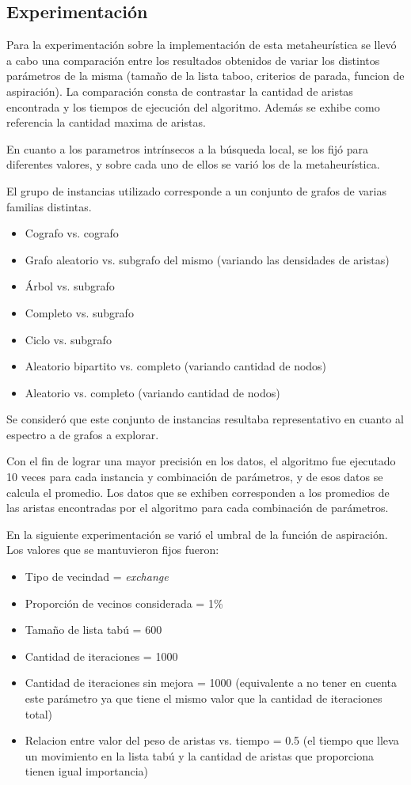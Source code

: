 \subsection{Experimentación}

Para la experimentación sobre la implementación de esta metaheurística se
llevó a cabo una comparación entre los resultados obtenidos de variar los
distintos parámetros de la misma (tamaño de la lista taboo, criterios de
parada, funcion de aspiración). La comparación consta de contrastar la
cantidad de aristas encontrada y los tiempos de ejecución del algoritmo.
Además se exhibe como referencia la cantidad maxima de aristas.

En cuanto a los parametros intrínsecos a la búsqueda local, se los
fijó para diferentes valores, y sobre cada uno de ellos se varió los de
la metaheurística.

El grupo de instancias utilizado corresponde a un conjunto de grafos de varias
familias distintas.

\begin{itemize}
\item Cografo vs. cografo
\item Grafo aleatorio vs. subgrafo del mismo (variando las densidades de
aristas)
\item Árbol vs. subgrafo
\item Completo vs. subgrafo
\item Ciclo vs. subgrafo
\item Aleatorio bipartito vs. completo (variando cantidad de nodos)
\item Aleatorio vs. completo (variando cantidad de nodos)
\end{itemize}

Se consideró que este conjunto de instancias resultaba representativo en
cuanto al espectro a de grafos a explorar.

Con el fin de lograr una mayor precisión en los datos, el algoritmo fue
ejecutado 10 veces para cada instancia y combinación de parámetros, y de esos
datos se calcula el promedio. Los datos que se exhiben corresponden a los
promedios de las aristas encontradas por el algoritmo para cada combinación de
parámetros.

En la siguiente experimentación se varió el umbral de la función de
aspiración. Los valores que se mantuvieron fijos fueron:

\begin{itemize}
\item Tipo de vecindad = \textit{exchange}
\item Proporción de vecinos considerada = 1\%
\item Tamaño de lista tabú = 600
\item Cantidad de iteraciones = 1000
\item Cantidad de iteraciones sin mejora = 1000 (equivalente a no tener en
cuenta este parámetro ya que tiene el mismo valor que la cantidad de
iteraciones total)
\item Relacion entre valor del peso de aristas vs. tiempo = 0.5 (el tiempo que
lleva un movimiento en la lista tabú y la cantidad de aristas que proporciona
tienen igual importancia)
\end{itemize}

